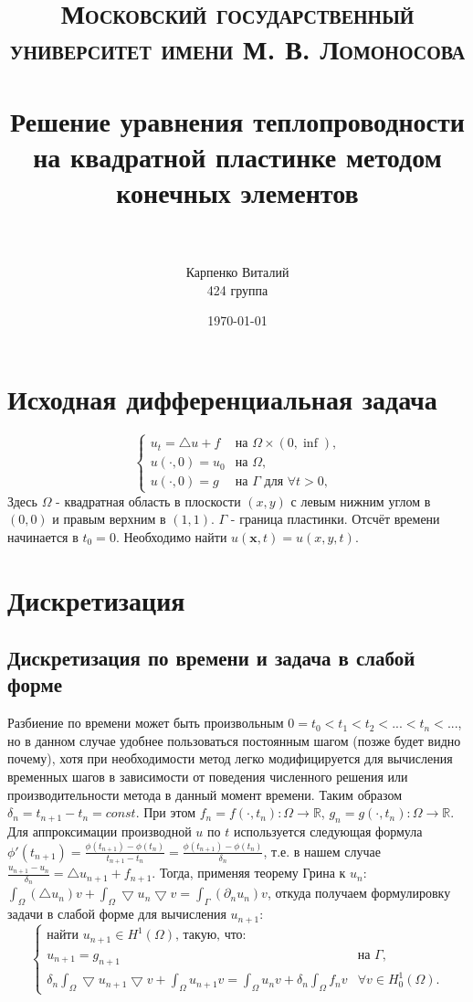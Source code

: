 \documentclass[paper=a4, fontsize=11pt]{scrartcl} %
\title{
\normalfont \normalsize
\textsc{Московский государственный университет имени М. В. Ломоносова} \\ [25pt] %
\horrule{0.5pt} \\[0.4cm] %
\huge Решение уравнения теплопроводности на квадратной пластинке методом конечных элементов  \\ %
\horrule{2pt} \\[0.5cm] %
}
\author{Карпенко Виталий \\
424 группа} %
\date{\normalsize\today} %
\numberwithin{equation}{section} %
\numberwithin{figure}{section} %
\numberwithin{table}{section} %
\begin{document}
\maketitle %

\section{Исходная дифференциальная задача}
    \[
        \begin{cases}
            u_t = \bigtriangleup u + f& \text{на $\Omega \times (0, \inf)$,} \\
            u(\cdot, 0) = u_0& \text{на $\Omega$}, \\
            u(\cdot, 0) = g& \text{на $\Gamma$ для $\forall t > 0$,}
        \end{cases}
    \]
Здесь $\Omega$ - квадратная область в плоскости $(x, y)$ с левым нижним углом в $(0, 0)$ и правым верхним в $(1, 1)$.
$\Gamma$ - граница пластинки. Отсчёт времени начинается в $t_0 = 0$. Необходимо найти $u(\bm{x}, t) = u(x, y, t)$.
\section{Дискретизация}
\subsection{Дискретизация по времени и задача в слабой форме}
Разбиение по времени может быть произвольным $0 = t_0 < t_1 < t_2 < ... < t_n < ...$, но в данном случае удобнее пользоваться постоянным шагом (позже будет видно почему), хотя при необходимости метод легко модифицируется для вычисления временных шагов в зависимости от поведения численного решения или производительности метода в данный момент времени. Таким образом $\delta_n = t_{n+1} - t_n = const$.
При этом $f_n = f(\cdot, t_n) : \Omega \rightarrow \mathbb{R}$, $g_n = g(\cdot, t_n) : \Omega \rightarrow \mathbb{R}$.
Для аппроксимации производной $u$ по $t$ используется следующая формула $\phi'(t_{n+1}) = \frac{\phi(t_{n+1}) - \phi(t_{n})}{t_{n+1} - t_{n}} = \frac{\phi(t_{n+1}) - \phi(t_{n})}{\delta_n}$, т.е. в нашем случае $\frac{u_{n+1} - u_n}{\delta_n} = \bigtriangleup u_{n+1} + f_{n+1}$.
Тогда, применяя теорему Грина к $u_n$: $\int_{\Omega}(\bigtriangleup u_n)v + \int_{\Omega}\bigtriangledown u_n \bigtriangledown v = \int_{\Gamma}(\partial_n u_n)v$, откуда получаем формулировку задачи в слабой форме для вычисления $u_{n+1}$:
    \[
        \begin{cases}
            \text{найти } u_{n+1} \in H^1(\Omega)\text{, такую, что:} \\
            u_{n+1} = g_{n+1}& \text{на $\Gamma$,} \\
            \delta_n \int_{\Omega} \bigtriangledown u_{n+1} \bigtriangledown v + \int_{\Omega} u_{n+1}v = \int_{\Omega} u_{n}v + \delta_n \int_{\Omega} f_{n}v& \forall v \in H^1_0(\Omega).
        \end{cases}
    \]
\end{document}
